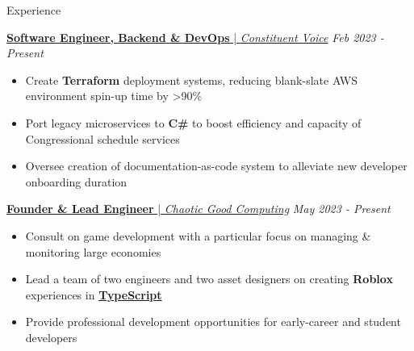 \documentclass{content/resume/resume}
\begin{document}
\begin{rSection}{Experience}

  \href{https://constituentvoice.com}{{\bf Software Engineer, Backend \& DevOps} | {\em Constituent Voice}} \hfill {\em Feb 2023 - Present}
  \vspace{-6pt}
  \begin{itemize}[nosep]
    \item Create \textbf{Terraform} deployment systems, reducing blank-slate AWS environment spin-up time by >90\%
    \item Port legacy microservices to \textbf{C\#} to boost efficiency and capacity of Congressional schedule services
    \item Oversee creation of documentation-as-code system to alleviate new developer onboarding duration
  \end{itemize}

  \href{https://blog.chaoticgood.computer}{{\bf Founder \& Lead Engineer} | {\em Chaotic Good Computing}} \hfill {\em May 2023 - Present}
  \vspace{-6pt}
  \begin{itemize}[nosep]
    \item Consult on game development with a particular focus on managing \& monitoring large economies
    \item Lead a team of two engineers and two asset designers on creating \textbf{Roblox} experiences in \href{https://chaoticgood.computer/?search=TypeScript}{\textbf{TypeScript}}
    \item Provide professional development opportunities for early-career and student developers
  \end{itemize}


\end{rSection}
\end{document}
